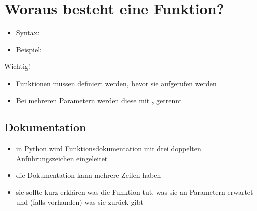 
\subtitle{Kapitel 6: wie Funktionen funktionieren}


\section{Woraus besteht eine Funktion?}
\begin{frame}
	\slidehead
	\vspace{-0.2cm}
	\begin{itemize}
		\item Syntax: 
		\pause
		\vspace{-0.05cm}
		\item Beispiel:
	\end{itemize}
	\vspace{-0.05cm}
	\pause
	\begin{block}{Wichtig!}
		\begin{itemize}
			\item Funktionen müssen definiert werden, bevor sie aufgerufen werden
			\item Bei mehreren Parametern werden diese mit \textbf{,} getrennt
		\end{itemize}
	\end{block}
\end{frame}

\subsection{Dokumentation}
\begin{frame}
	\slidehead
	\begin{itemize}
		\item in Python wird Funktionsdokumentation mit drei doppelten Anführungszeichen eingeleitet
		\item die Dokumentation kann mehrere Zeilen haben
		\item sie sollte kurz erklären was die Funktion tut, was sie an Parametern erwartet und (falls vorhanden) was sie zurück gibt
	\end{itemize}
\end{frame}

